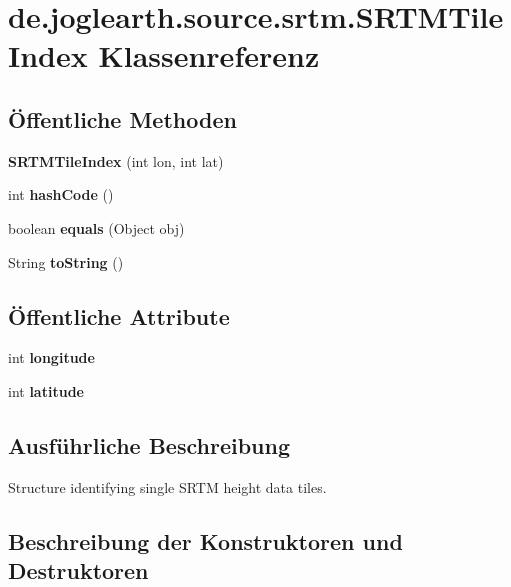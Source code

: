 \section{de.\-joglearth.\-source.\-srtm.\-S\-R\-T\-M\-Tile\-Index Klassenreferenz}
\label{classde_1_1joglearth_1_1source_1_1srtm_1_1_s_r_t_m_tile_index}
\subsection*{Öffentliche Methoden}
\begin{DoxyCompactItemize}
\item 
{\bf S\-R\-T\-M\-Tile\-Index} (int lon, int lat)
\item 
int {\bfseries hash\-Code} ()\label{classde_1_1joglearth_1_1source_1_1srtm_1_1_s_r_t_m_tile_index_a7e154c052887eb7034ecd6cbbc33f397}

\item 
boolean {\bfseries equals} (Object obj)\label{classde_1_1joglearth_1_1source_1_1srtm_1_1_s_r_t_m_tile_index_a52a8ebdf041830445c73ae272543e91a}

\item 
String {\bfseries to\-String} ()\label{classde_1_1joglearth_1_1source_1_1srtm_1_1_s_r_t_m_tile_index_a4c7b4e394776d048c9a2acf68de94638}

\end{DoxyCompactItemize}
\subsection*{Öffentliche Attribute}
\begin{DoxyCompactItemize}
\item 
int {\bf longitude}
\item 
int {\bf latitude}
\end{DoxyCompactItemize}


\subsection{Ausführliche Beschreibung}
Structure identifying single S\-R\-T\-M height data tiles. 

\subsection{Beschreibung der Konstruktoren und Destruktoren}
